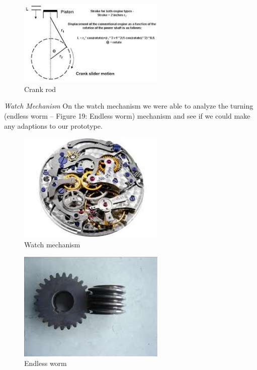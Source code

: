 \begin{figure}[h]
\centering
\includegraphics[width=7cm]{brazil_images/image019.jpg}
\caption{Crank rod} %
\label{fig:crank_rod}
\end{figure}


\emph{Watch Mechanism} On the watch mechanism we were able to analyze the turning (endless worm – Figure 19: Endless worm) mechanism and see if we could make any adaptions to our prototype.

\begin{figure}[h]
\centering
\includegraphics[width=7cm]{brazil_images/image020.jpg}
\caption{Watch mechanism}%
\label{fig:watch_mechanism}
\end{figure}


\begin{figure}[h]
\centering
\includegraphics[width=7cm]{brazil_images/image021.jpg}
\caption{Endless worm} %
\label{fig:endless_worm}
\end{figure}



